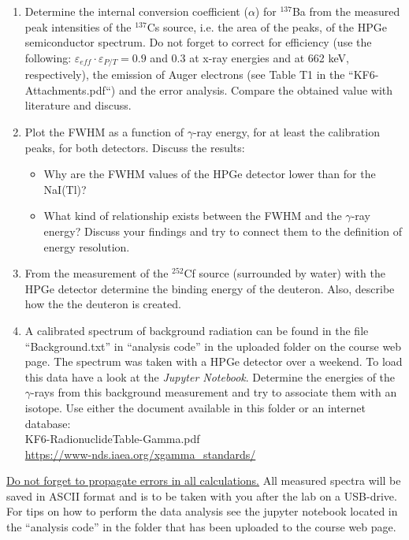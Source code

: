 \documentclass[12pt]{article}
\begin{document}
\begin{enumerate}
  \item Determine the internal conversion coefficient ($\alpha$) for $^{137}$Ba from the measured peak intensities of the $^{137}$Cs source, i.e. the area of the peaks, of the HPGe semiconductor spectrum. Do not forget to correct for efficiency (use the following: $\varepsilon_{eff} \cdot \varepsilon_{P/T} = 0.9$ and 0.3 at x-ray energies and at 662 keV, respectively), the emission of Auger electrons (see Table T1 in the ``KF6-Attachments.pdf``) and the error analysis. Compare the obtained value with literature and discuss.
  \item Plot the FWHM as a function of $\gamma$-ray energy, for at least the calibration peaks, for both detectors. Discuss the results:
    \begin{itemize}
      \item Why are the FWHM values of the HPGe detector lower than for the NaI(Tl)?
      \item What kind of relationship exists between the FWHM and the $\gamma$-ray energy? Discuss your findings and try to connect them to the definition of energy resolution.
    \end{itemize}
  \item From the measurement of the $^{252}$Cf source (surrounded by water) with the HPGe detector determine the binding energy of the deuteron. Also, describe how the the deuteron is created.
  \item A calibrated spectrum of background radiation can be found in the file ``Background.txt'' in ``analysis code'' in the uploaded folder on the course web page. The spectrum was taken with a HPGe detector over a weekend. To load this data have a look at the {\it Jupyter Notebook}. Determine the energies of the $\gamma$-rays from this background measurement and try to associate them with an isotope. Use either the document available in this folder or an internet database: \\
    KF6-RadionuclideTable-Gamma.pdf \\
    \href{https://www-nds.iaea.org/xgamma\_standards/}{https://www-nds.iaea.org/xgamma\_standards/}
\end{enumerate}

\underline{Do not forget to propagate errors in all calculations.} All measured spectra will be saved in ASCII format and is to be taken with you after the lab on a USB-drive. For tips on how to perform the data analysis see the jupyter notebook located in the ``analysis code'' in the folder that has been uploaded to the course web page.
\end{document}
